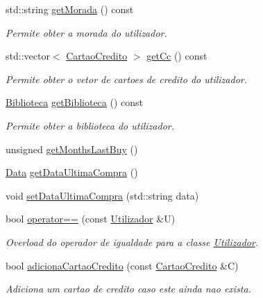 \begin{DoxyCompactItemize}
std\+::string \mbox{\hyperlink{class_utilizador_aea27372a36fb8e59d2f3029464d83101}{get\+Morada}} () const
\begin{DoxyCompactList}\small\item\em Permite obter a morada do utilizador. \end{DoxyCompactList}\item 
std\+::vector$<$ \mbox{\hyperlink{class_cartao_credito}{Cartao\+Credito}} $>$ \mbox{\hyperlink{class_utilizador_ad0ebe5ff80aa77145ec4b0ce5473102c}{get\+Cc}} () const
\begin{DoxyCompactList}\small\item\em Permite obter o vetor de cartoes de credito do utilizador. \end{DoxyCompactList}\item 
\mbox{\hyperlink{class_biblioteca}{Biblioteca}} \mbox{\hyperlink{class_utilizador_a6a128859b776bf019b5652ce61f62280}{get\+Biblioteca}} () const
\begin{DoxyCompactList}\small\item\em Permite obter a biblioteca do utilizador. \end{DoxyCompactList}\item 
unsigned \mbox{\hyperlink{class_utilizador_a8c4c3275a56142c31f19c7af78e3c88f}{get\+Months\+Last\+Buy}} ()
\item 
\mbox{\hyperlink{class_data}{Data}} \mbox{\hyperlink{class_utilizador_a68fcb8d8b1ebce49da37439aaa1a7b79}{get\+Data\+Ultima\+Compra}} ()
\item 
void \mbox{\hyperlink{class_utilizador_ac3c7ff821739e5682a5d06d0868031ac}{set\+Data\+Ultima\+Compra}} (std\+::string data)
\item 
bool \mbox{\hyperlink{class_utilizador_abd73f24d4eb5fa0838af819e8343b1f5}{operator==}} (const \mbox{\hyperlink{class_utilizador}{Utilizador}} \&U)
\begin{DoxyCompactList}\small\item\em Overload do operador de igualdade para a classe \mbox{\hyperlink{class_utilizador}{Utilizador}}. \end{DoxyCompactList}\item 
bool \mbox{\hyperlink{class_utilizador_a60b1025ffe94b9f2414f54cc94662cc9}{adiciona\+Cartao\+Credito}} (const \mbox{\hyperlink{class_cartao_credito}{Cartao\+Credito}} \&C)
\begin{DoxyCompactList}\small\item\em Adiciona um cartao de credito caso este ainda nao exista. \end{DoxyCompactList}\item 

\end{DoxyCompactItemize}
